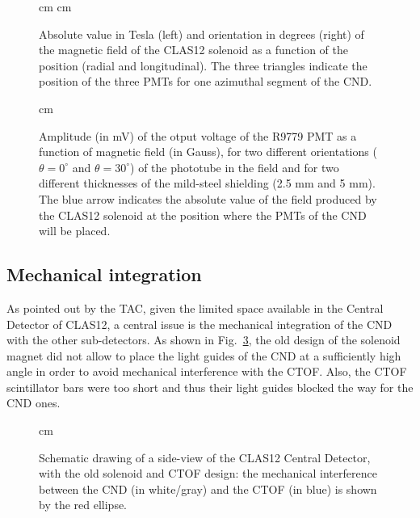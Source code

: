 \documentclass[12pt,oneside]{article}
\begin{document}
{\begin{figure}[h]  
 cm
 cm
\caption{Absolute value in Tesla (left) and orientation in degrees (right) of the magnetic field of the CLAS12 solenoid as a function of the position (radial and longitudinal). The three triangles indicate the position of the three PMTs for one azimuthal segment of the CND. }
\label{field_map}
\end{figure}

\begin{figure}[h]  
\begin{center}
 cm
\caption{Amplitude (in mV) of the otput voltage of the R9779 PMT as a function of magnetic field (in Gauss), for two different orientations ($\theta=0^{\circ}$ and $\theta=30^{\circ}$) of the phototube in the field and for two different thicknesses of the mild-steel shielding (2.5 mm and 5 mm). The blue arrow indicates the absolute value of the field produced by the CLAS12 solenoid at the position where the PMTs of the CND will be placed.}
\label{field_tests}
\end{center}
\end{figure}

\subsection{Mechanical integration}
As pointed out by the TAC, given the limited space available in the Central Detector of CLAS12, a central issue is the mechanical integration of the CND with the other sub-detectors. As shown in Fig.~\ref{old_interference}, the old design of the solenoid magnet did not allow to place the light guides of the CND at a sufficiently high angle in order to avoid mechanical interference with the CTOF. Also, the CTOF scintillator bars were too short and thus their light guides blocked the way for the CND ones.  

\begin{figure}[h]  
\begin{center}
 cm
\caption{Schematic drawing of a side-view of the CLAS12 Central Detector, with the old solenoid and CTOF design: the mechanical interference between the CND (in white/gray) and the CTOF (in blue) is shown by the red ellipse.}
\label{old_interference}
\end{center}
\end{figure}

}
\end{document}
